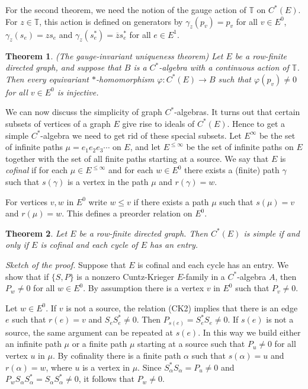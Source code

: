 \documentclass[11pt]{amsart}
\def\ol{\overline}
\theoremstyle{plain}            %
\newtheorem{theorem}{Theorem}[section]
\theoremstyle{definition}       %
\theoremstyle{definition}       %
\theoremstyle{remark}
\begin{document}
For the second theorem, we need the notion of the gauge action of $\mathbb T$ on $C^*(E)$. For $z\in \mathbb T$, this action is defined on generators by $\gamma_z(p_v)= p_v$ for all $v\in E^0$, $\gamma_z (s_e) = z s_e$ and
$ \gamma_z (s_e^*) = \ol{z} s_e^*$ for all $e\in E^1$. 

\begin{theorem} (The gauge-invariant uniqueness theorem)
	\label{thm:gauge-invariant}
	Let $E$ be a row-finite directed graph, and suppose that $B$ is a $C^*$-algebra with a continuous action of $\mathbb T$. Then every equivariant $*$-homomorphism $\varphi \colon C^*(E)\to B$ such that $\varphi (p_v)\ne 0$ for all $v\in E^0$ is injective. 
\end{theorem}



We can now discuss the simplicity of graph $C^*$-algebras. It turns out that certain subsets of vertices of a graph $E$ give rise to ideals of $C^*(E)$. Hence to get a simple $C^*$-algebra we need to get rid of these special subsets. Let $E^{\infty}$ be the set of infinite paths $\mu = e_1e_2e_3\cdots $ on $E$, and let $E^{\le \infty}$ be the set of infinite paths on $E$ together with the set of all finite paths starting at a source. 
We say that $E$ is {\it cofinal} if for each $\mu \in E^{\le \infty}$ and for each $w\in E^0$ there exists a (finite) path $\gamma $ such that $s(\gamma)$ is a vertex in the path $\mu$ and $r(\gamma )= w$. 

For vertices $v,w$ in $E^0$ write $w\le v$ if there exists a path $\mu$ such that $s(\mu) = v$ and $r(\mu) =w$. This defines a preorder relation on $E^0$. 


\begin{theorem}
	\label{thm:charac-simplicity}
	Let $E$ be a row-finite directed graph. Then $C^*(E)$ is simple if and only if $E$ is cofinal and each cycle of $E$ has an entry. 
\end{theorem}

{\it Sketch of the proof.} Suppose that $E$ is cofinal and each cycle has an entry. We show that if $\{ S,P\}$ is a nonzero Cuntz-Krieger $E$-family in a $C^*$-algebra $A$, then $P_w\ne 0$ for all $w\in E^0$. By assumption there is a vertex $v$ in $E^0$ such that $P_v\ne 0$.  

Let $w\in E^0$. If $v$ is not a source, the relation (CK2) implies that there is an edge $e$ such that $r(e)= v$ and $S_eS_e^*\ne 0$. Then  $P_{s(e)}=S_e^*S_e \ne 0$. If $s(e)$ is not a source, the same argument can be repeated at $s(e)$. In this way we build either an infinite path $\mu$ or a finite path $\mu$ starting at a source such that $P_u\ne 0$ for all vertex $u$ in $\mu$. By cofinality there is a finite path $\alpha$ such that $s(\alpha)= u$ and $r(\alpha) = w$, where $u$ is a vertex in $\mu$. Since $S_\alpha^* S_{\alpha}=P_u\ne 0$ and
$P_wS_{\alpha}S_{\alpha}^* = S_\alpha S_\alpha ^* \ne 0$, it follows that $P_w\ne 0$. 
\end{document}
